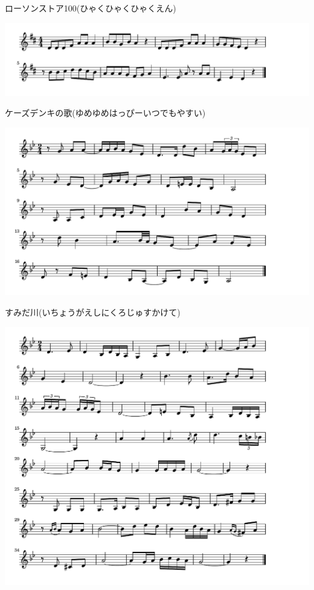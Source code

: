 \documentclass[a4paper]{ltjsarticle}
\begin{document}
\vspace{-10mm} \hspace{10mm}
ローソンストア100(ひゃくひゃくひゃくえん)

\includegraphics[clip]{ksdenki_crop.pdf}

\vspace{-10mm} \hspace{10mm}
ケーズデンキの歌(ゆめゆめはっぴーいつでもやすい)

\includegraphics[clip]{sumidagawa_crop.pdf}

\vspace{-10mm} \hspace{10mm}
すみだ川(いちょうがえしにくろじゅすかけて)

\includegraphics[clip]{darekakokyowo_crop.pdf}
\end{document}
